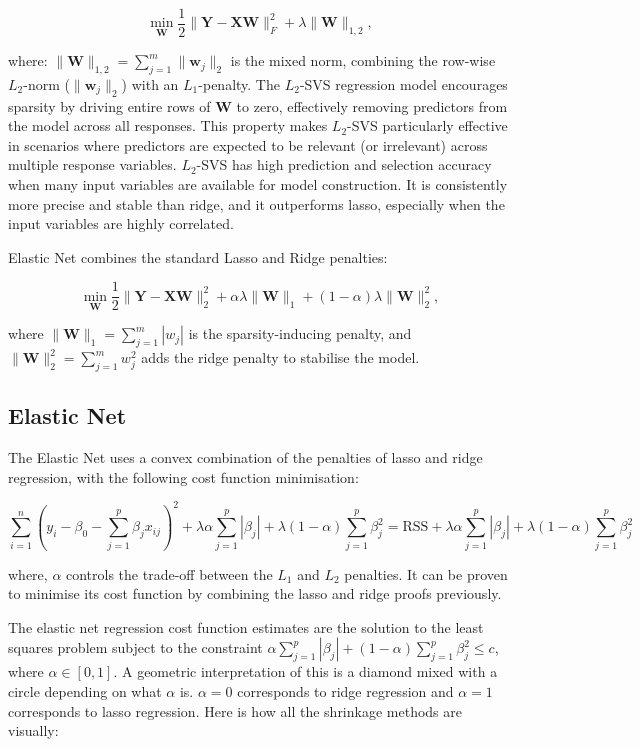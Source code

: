 \[
\min_{\mathbf{W}} \frac{1}{2} \|\mathbf{Y} - \mathbf{X}\mathbf{W}\|_F^2 + \lambda \|\mathbf{W}\|_{1,2},
\]

where: \(\|\mathbf{W}\|_{1,2} = \sum_{j=1}^m \|\mathbf{w}_j\|_2\) is the mixed norm, combining the row-wise \(L_2\)-norm (\(\|\mathbf{w}_j\|_2\)) with an \(L_1\)-penalty. The \(L_2\)-SVS regression model encourages sparsity by driving entire rows of \(\mathbf{W}\) to zero, effectively removing predictors from the model across all responses. This property makes \(L_2\)-SVS particularly effective in scenarios where predictors are expected to be relevant (or irrelevant) across multiple response variables. \(L_2\)-SVS has high prediction and selection accuracy when many input variables are available for model construction.\cite{simila2007input} It is consistently more precise and stable than ridge, and it outperforms lasso, especially when the input variables are highly correlated.\cite{simila2007input} 

\noindent Elastic Net combines the standard Lasso and Ridge penalties:

\[
\min_{\mathbf{W}} \frac{1}{2} \| \mathbf{Y} - \mathbf{X}\mathbf{W} \|_2^2 + \alpha \lambda \|\mathbf{W}\|_1 + (1-\alpha)\lambda \|\mathbf{W}\|_2^2,
\]

\noindent where \(\|\mathbf{W}\|_1 = \sum_{j=1}^m |w_j|\) is the sparsity-inducing penalty, and \(\|\mathbf{W}\|_2^2 = \sum_{j=1}^m w_j^2\) adds the ridge penalty to stabilise the model.


\subsection{Elastic Net}
The Elastic Net uses a convex combination of the penalties of lasso and ridge regression, with the following cost function minimisation:\cite{elasticnet}

\begin{equation*}
    \sum_{i=1}^{n} \left( y_i - \beta_0 - \sum_{j=1}^{p} \beta_j x_{ij} \right)^2 
+ \lambda \alpha \sum_{j=1}^{p} |\beta_j| 
+ \lambda (1 - \alpha) \sum_{j=1}^{p} \beta_j^2
= \text{RSS} + \lambda \alpha \sum_{j=1}^{p} |\beta_j| + \lambda (1 - \alpha) \sum_{j=1}^{p} \beta_j^2
\end{equation*}

\noindent where, $\alpha$ controls the trade-off between the $L_1$ and $L_2$ penalties. It can be proven to minimise its cost function by combining the lasso and ridge proofs previously.

The elastic net regression cost function estimates are the solution to the least squares problem subject to the constraint $\alpha\sum_{j=1}^p |\beta_j| + (1-\alpha)\sum_{j=1}^p \beta_j^2\leq c$, where $\alpha \in [0,1]$. A geometric interpretation of this is a diamond mixed with a circle depending on what $\alpha$ is. $\alpha = 0$ corresponds to ridge regression and $\alpha = 1$ corresponds to lasso regression. Here is how all the shrinkage methods are visually:

